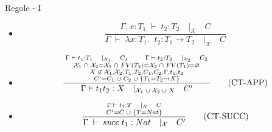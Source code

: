 \documentclass{beamer}
\newcommand*{\bfrac}[2]{\genfrac{}{}{0pt}{1}{#1}{#2}}
\begin{document}
\begin{tframe}{Regole - I}

\begin{itemize}

\item<1->[]
  \begin{equation}
    \frac{\Gamma, x : T_1 \; \vdash \; t_2 : T_2  \quad |_\mathcal{X} \quad C}{\Gamma \; \vdash \; \lambda x : T_1. \; \; t_2 : T_1 \rightarrow T_2 \quad |_\mathcal{X} \quad C}\tag{CT-ABS}
  \end{equation}
  \vspace{0.05cm}
\item<2->[]
  \begin{equation} 
    \frac{\bfrac{\bfrac{\Gamma \; \vdash \; t_1 : T_1 \quad |_{\mathcal{X}_1} \quad C_1 \qquad \Gamma \; \vdash \; t_2 : T_2 \quad |_{\mathcal{X}_2} \quad C_2 \vspace{0.01cm}}{\mathcal{X}_1 \; \cap \; \mathcal{X}_2 = \mathcal{X}_1 \; \cap \; FV(T_2) = \mathcal{X}_2 \; \cap \; FV(T_1) = \varnothing  \vspace{0.01cm}} }{\bfrac{X \; \not \in \; \mathcal{X}_1, \mathcal{X}_2, T_1, T_2, C_1, C_2, \Gamma, t_1, t_2  \vspace{0.01cm}}{C' = C_1 \; \cup \; C_2 \; \cup \; \{T_1 = T_2 \rightarrow X \}  \vspace{0.1cm}}}}{\Gamma \vdash t_1 t_2 : X \quad |_{\mathcal{X}_1 \; \cup \; \mathcal{X}_2 \; \cup \; X} \quad C'}\tag{CT-APP}
  \end{equation}
    \vspace{0.05cm}
  \item<3->[]
  \begin{equation}
    \frac{\bfrac{\Gamma \; \vdash \; t_1 : T \quad |_{\mathcal{X}} \quad C}{C' = C  \; \cup \; \{ T = Nat \}}}{\Gamma \; \vdash \; succ \; t_1 : Nat \quad |_\mathcal{X} \quad C'}\tag{CT-SUCC}
  \end{equation}  
\end{itemize}
\end{tframe}
\end{document}
